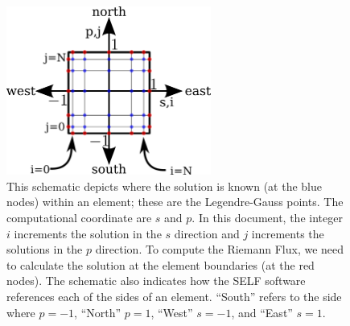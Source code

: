 \documentclass{softwaremanual}
\begin{document}
\begin{figure}
\begin{center}
\includegraphics[width=0.6\textwidth]{../figures/geometry/elementsimple.png}
\caption{This schematic depicts where the solution is known (at the blue nodes) within an element; these are the Legendre-Gauss points. The computational coordinate are $s$ and $p$. In this document, the integer $i$ increments the solution in the $s$ direction and $j$ increments the solutions in the $p$ direction. To compute the Riemann Flux, we need to calculate the solution at the element boundaries (at the red nodes). The schematic also indicates how the SELF software references each of the sides of an element. ``South'' refers to the side where $p=-1$, ``North'' $p=1$, ``West'' $s=-1$, and ``East'' $s=1$.}
\end{center}
\end{figure}
\end{document}
